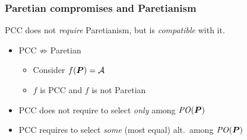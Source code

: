 \documentclass[french, english]{beamer}
\begin{document}
\begin{frame}
	\frametitle{Paretian compromises and Paretianism}
	PCC does not \emph{require} Paretianism, but is \emph{compatible} with it.
	\begin{itemize}
		\item PCC $\not⇒$ Paretian
		\begin{itemize}
			\item Consider $f(\boldsymbol{P}) = \mathcal{A}$
			\item $f$ is PCC and $f$ is not Paretian
		\end{itemize}
		\item PCC does not require to select \emph{only} among $\mathit{PO}(\boldsymbol{P})$
		\item PCC requires to select \emph{some} {(most equal)} alt.\ among $\mathit{PO}(\boldsymbol{P})$
	\end{itemize}
\end{frame}

\end{document}
